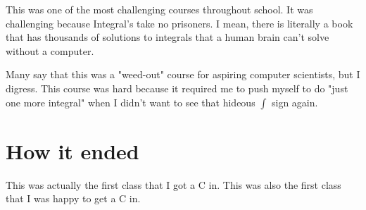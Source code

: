 This was one of the most challenging courses throughout school. It was challenging
because Integral's take no prisoners. I mean, there is literally a book that has
thousands of solutions to integrals that a human brain can't solve without a computer.


Many say that this was a "weed-out" course for aspiring computer scientists, but I digress.
This course was hard because it required me to push myself to do "just one more integral" when
I didn't want to see that hideous \(\int\) sign again.




\section{How it ended}
This was actually the first class that I got a C in. This was also the first class that
I was happy to get a C in.